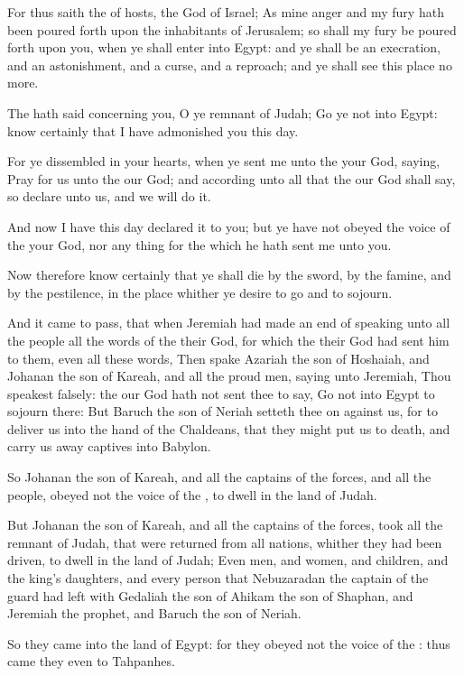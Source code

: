 \Verse For thus saith the \LORD of hosts, the God of Israel; As mine anger and my fury hath been poured forth upon the inhabitants of Jerusalem; so shall my fury be poured forth upon you, when ye shall enter into Egypt: and ye shall be an execration, and an astonishment, and a curse, and a reproach; and ye shall see this place no more.

\Verse The \LORD hath said concerning you, O ye remnant of Judah; Go ye not into Egypt: know certainly that I have admonished you this day.

\Verse For ye dissembled in your hearts, when ye sent me unto the \LORD your God, saying, Pray for us unto the \LORD our God; and according unto all that the \LORD our God shall say, so declare unto us, and we will do it.

\Verse And now I have this day declared it to you; but ye have not obeyed the voice of the \LORD your God, nor any thing for the which he hath sent me unto you.

\Verse Now therefore know certainly that ye shall die by the sword, by the famine, and by the pestilence, in the place whither ye desire to go and to sojourn.


\Chapter
\Verse And it came to pass, that when Jeremiah had made an end of speaking unto all the people all the words of the \LORD their God, for which the \LORD their God had sent him to them, even all these words, \Verse Then spake Azariah the son of Hoshaiah, and Johanan the son of Kareah, and all the proud men, saying unto Jeremiah, Thou speakest falsely: the \LORD our God hath not sent thee to say, Go not into Egypt to sojourn there: \Verse But Baruch the son of Neriah setteth thee on against us, for to deliver us into the hand of the Chaldeans, that they might put us to death, and carry us away captives into Babylon.

\Verse So Johanan the son of Kareah, and all the captains of the forces, and all the people, obeyed not the voice of the \LORD, to dwell in the land of Judah.

\Verse But Johanan the son of Kareah, and all the captains of the forces, took all the remnant of Judah, that were returned from all nations, whither they had been driven, to dwell in the land of Judah; \Verse Even men, and women, and children, and the king's daughters, and every person that Nebuzaradan the captain of the guard had left with Gedaliah the son of Ahikam the son of Shaphan, and Jeremiah the prophet, and Baruch the son of Neriah.

\Verse So they came into the land of Egypt: for they obeyed not the voice of the \LORD: thus came they even to Tahpanhes.

